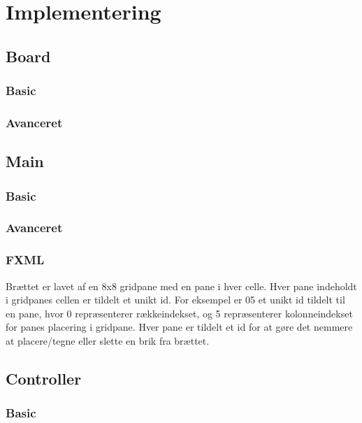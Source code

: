 \section{Implementering}

\subsection{Board}

\subsubsection{Basic}

\subsubsection{Avanceret}

\subsection{Main}

\subsubsection{Basic}

\subsubsection{Avanceret}

\subsubsection{FXML}\label{BD}
Brættet er lavet af en 8x8 gridpane med en pane i hver celle. Hver pane indeholdt i gridpanes cellen er tildelt et unikt id. For eksempel er 05 et unikt id tildelt til en pane, hvor 0 repræsenterer rækkeindekset, og 5 repræsenterer kolonneindekset for panes placering i gridpane. Hver pane er tildelt et id for at gøre det nemmere at placere/tegne eller slette en brik fra brættet.


\subsection{Controller}

\subsubsection{Basic}



